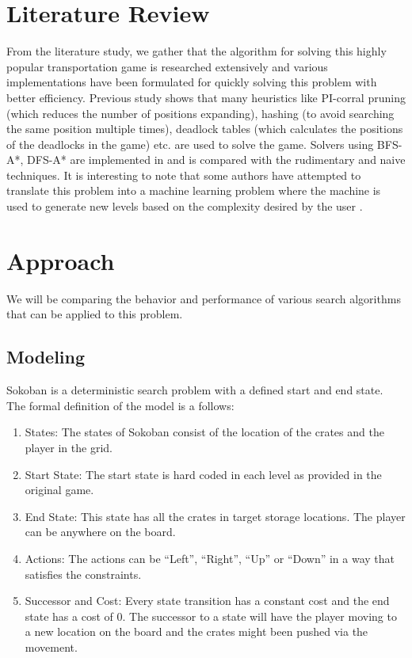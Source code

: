 \documentclass[10pt, final]{article}
\begin{document}
	\section{Literature Review}
	From the literature study, we gather that the algorithm for solving this highly popular transportation game is researched extensively and various implementations have been formulated for quickly solving this problem with better efficiency. Previous study shows that many heuristics \cite{2} like PI-corral pruning (which reduces the number of positions expanding), hashing (to avoid searching the same position multiple times), deadlock tables (which calculates the positions of the deadlocks in the game) etc. are used to solve the game. Solvers using BFS-A*, DFS-A* are implemented in \cite{3} and is compared with the rudimentary and naive techniques. It is interesting to note that some authors have attempted to translate this problem into a machine learning problem where the machine is used to generate new levels based on the complexity desired by the user \cite{4}.
	
	\section{Approach}
	We will be comparing the behavior and performance of various search algorithms that can be applied to this problem.
	\subsection{Modeling}
	Sokoban is a deterministic search problem with a defined start and end state. The formal definition of the model is a follows:
	\begin{enumerate}
		\item States: The states of Sokoban consist of the location of the crates and the player in the grid.
		\item Start State: The start state is hard coded in each level as provided in the original game.
		\item End State: This state has all the crates in target storage locations. The player can be anywhere on the board.
		\item Actions: The actions can be ``Left'', ``Right'', ``Up'' or ``Down'' in a way that satisfies the constraints.
		\item Successor and Cost: Every state transition has a constant cost and the end state has a cost of $0$. The successor to a state will have the player moving to a new location on the board and the crates might been pushed via the movement.
	\end{enumerate}
\end{document}
